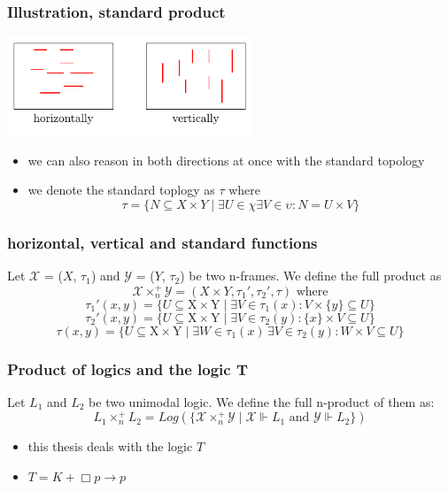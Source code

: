 \documentclass[hyperref={pdfpagelabels=false},t,10pt]{beamer}
\begin{document}
\begin{frame}
  \frametitle{Illustration, standard product}
    \centering
    \includegraphics[width=0.55\textwidth]{Example4.pdf} \pause
  \begin{itemize}
    \item we can also reason in both directions at once with the standard topology
    \item we denote the standard toplogy as $\tau$ where 
    $$\tau = \{N \subseteq X \times Y \mid \exists U \in \chi \exists V \in \upsilon: N = U \times V\}$$  
  \end{itemize}

\end{frame}

\begin{frame}
  \frametitle{horizontal, vertical and standard functions}
  Let $\mathcal{X}$ = ($X$, $\tau_1$) and $\mathcal{Y}$ = ($Y$, $\tau_2$) be two n-frames. We define the full product as
    $$\mathcal{X} \times_n^+  \mathcal{Y} = (X \times Y, \tau_1', \tau_2', \tau) \text{ where}$$
    $$ \tau_1'(x,y) = \{ U \subseteq \mbox{X} \times \mbox{Y} \mid \exists V \in \tau_1(x) : V \times  \{ y \} \subseteq U \}$$
    $$ \tau_2'(x,y) = \{ U \subseteq \mbox{X} \times \mbox{Y} \mid \exists V \in \tau_2(y) : \{ x \} \times V \subseteq U \}$$
        $$ \tau(x,y) = \{ U \subseteq \mbox{X} \times \mbox{Y} \mid \exists W \in \tau_1(x) \, \exists V \in \tau_2(y) : W \times V \subseteq U \}$$   
\end{frame}

\begin{frame}
  \frametitle{Product of logics and the logic T}
  Let $L_1$ and $L_2$ be two unimodal logic. We define the full n-product of them as:
  $$L_1 \times_n^+ L_2 =  Log(\{\mathcal{X} \times_n^+ \mathcal{Y} \mid \mathcal{X} \Vdash L_1 \text{ and } \mathcal{Y} \Vdash L_2 \})$$ \pause
  \begin{itemize}
    \item this thesis deals with the logic $T$
    \item $T = K + \Box p \rightarrow p$
  \end{itemize}
\end{frame}
\end{document}

